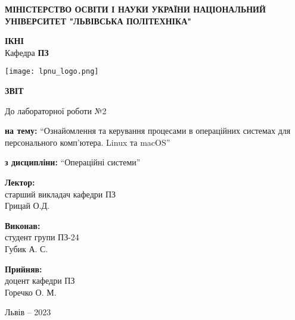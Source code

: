 \documentclass[12pt]{extarticle}
\begin{document}
\begin{titlepage}
    \begin{center}
        \textbf{\normalsize{\MakeUppercase{
            Міністерство Освіти і науки України
            Національний університет "Львівська політехніка"
        }}}

        \begin{flushright}
        \textbf{ІКНІ}\\
        Кафедра \textbf{ПЗ}
        \end{flushright}
        \vspace{15mm}

        \texttt{[image: lpnu\_logo.png]}

        \vspace*{\fill}

        \textbf{\normalsize{\MakeUppercase{Звіт}}}
            
        До лабораторної роботи №2

        \textbf{на тему:} “Ознайомлення та керування процесами
         в операційних системах для персонального комп'ютера. Linux та macOS”

        \textbf{з дисципліни:} “Операційні системи”
            
        \vspace*{\fill}

        \begin{flushright}

            \textbf{Лектор:}\\
            старший викладач кафедри ПЗ\\
            Грицай О.Д.\\
            \vspace{12pt}

            \textbf{Виконав:}\\
            студент групи ПЗ-24\\
            Губик А. С.\\
            \vspace{12pt}

            \textbf{Прийняв:}\\
            доцент кафедри ПЗ\\
            Горечко О. М.\\
        \vspace{12pt}
        \end{flushright}

        Львів -- 2023
            
            
    \end{center}
\end{titlepage}
\end{document}
